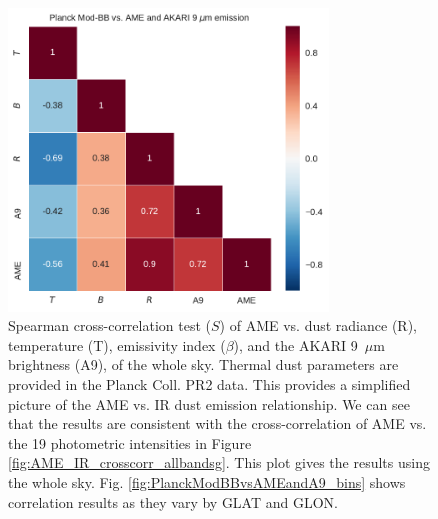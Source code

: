 \documentclass[preprint2,longabstract]{aastex}
\begin{document}
      \begin{figure}
        \label{fig:PlanckModBBvsAMEandA9}
        \includegraphics[width=85mm]{../Plots/PlanckModBBvsAMEandA9.pdf}
        \centering
        \caption{Spearman cross-correlation test ($S$) of AME vs. dust radiance (R), temperature (T),  emissivity index ($\beta$), and the AKARI 9~$\mu$m brightness (A9), of the whole sky. Thermal dust parameters are provided in the Planck Coll. PR2 data. This provides a simplified picture of the AME vs. IR dust emission relationship. We can see that the results are consistent with the cross-correlation of AME vs. the 19 photometric intensities in Figure \ref{fig:AME_IR_crosscorr_allbandsg}. This plot gives the results using the whole sky. Fig. \ref{fig:PlanckModBBvsAMEandA9_bins} shows correlation results as they vary by GLAT and GLON. }
      \end{figure}
\end{document}
